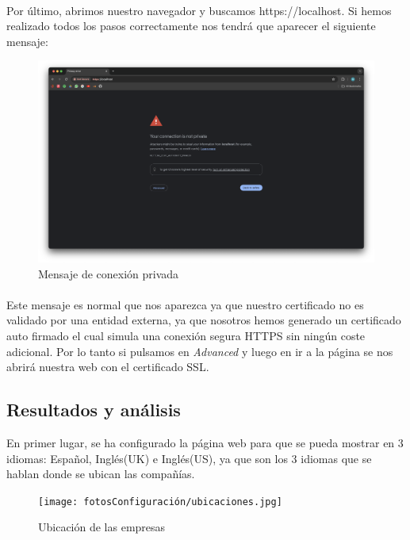 \paragraph{}
Por último, abrimos nuestro navegador y buscamos https://localhost. Si hemos realizado todos los pasos correctamente nos tendrá que aparecer el siguiente mensaje: 
\begin{figure}[h]
    \centering
    \includegraphics[width=1\linewidth]{conNotPrivate.png}
    \caption{Mensaje de conexión privada}
\end{figure}
\paragraph{}
Este mensaje es normal que nos aparezca ya que nuestro certificado no es validado por una entidad externa, ya que nosotros hemos generado un certificado auto firmado el cual simula una conexión segura HTTPS sin ningún coste adicional. Por lo tanto si pulsamos en \textit{Advanced} y luego en ir a la página se nos abrirá nuestra web con el certificado SSL.

\subsection{Resultados y análisis}
En primer lugar, se ha configurado la página web para que se pueda mostrar en 3 idiomas: Español, Inglés(UK) e Inglés(US), ya que son los 3 idiomas que se hablan donde se ubican las compañías. 
\begin{figure}[h]
    \centering
    \texttt{[image: fotosConfiguración/ubicaciones.jpg]}
    \caption{Ubicación de las empresas}
    \label{fig:enter-label}
\end{figure}

